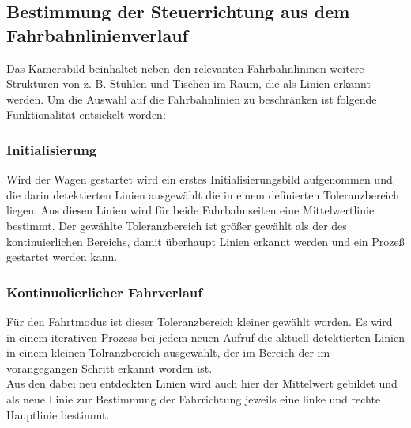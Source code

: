 \subsection{Bestimmung der Steuerrichtung aus dem Fahrbahnlinienverlauf}
Das Kamerabild beinhaltet neben den relevanten Fahrbahnlininen weitere
Strukturen von z. B. Stühlen und Tischen im Raum, die als Linien erkannt werden.
Um die Auswahl auf die Fahrbahnlinien zu beschränken ist folgende Funktionalität
entsickelt worden:
\subsubsection{Initialisierung}
Wird der Wagen gestartet wird ein erstes Initialisierungsbild aufgenommen und
die darin detektierten Linien ausgewählt die in einem definierten
Toleranzbereich liegen. Aus diesen Linien wird für beide Fahrbahnseiten eine
Mittelwertlinie bestimmt. Der gewählte Toleranzbereich ist größer gewählt als
der des kontinuierlichen Bereichs, damit überhaupt Linien erkannt werden und ein
Prozeß gestartet werden kann.\\
\subsubsection{Kontinuolierlicher Fahrverlauf}
Für den Fahrtmodus ist dieser Toleranzbereich kleiner gewählt worden. Es wird in
einem iterativen Prozess bei jedem neuen Aufruf die aktuell detektierten Linien
in einem kleinen Tolranzbereich ausgewählt, der im Bereich der im vorangegangen
Schritt erkannt worden ist.\\
Aus den dabei neu entdeckten Linien wird auch hier der Mittelwert gebildet und
als neue Linie zur Bestimmung der Fahrrichtung jeweils eine linke und rechte
Hauptlinie bestimmt.\\
